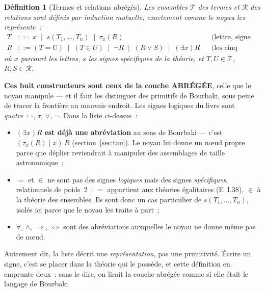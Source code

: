 \documentclass[11pt]{article}
\newtheorem{definition}{Définition}
\theoremstyle{remark}\newtheorem{example}{Exemple}
\begin{document}
\begin{definition}[Termes et relations abrégés]\label{def:langage}
Les ensembles $\mathcal{T}$ des \emph{termes} et $\mathcal{R}$ des \emph{relations}
sont définis par induction mutuelle, exactement comme le noyau les représente~:
\begin{align*}
  T &::= x \;\mid\; s(T_1,\dots,T_n) \;\mid\; \tau_x(R)
     &&\text{(lettre, signe spécifique, choix)}\\
  R &::= (T = U) \;\mid\; (T \in U) \;\mid\; \neg R \;\mid\; (R \vee S)
        \;\mid\; (\exists x)R
     &&\text{(les cinq formateurs de relation)}
\end{align*}
où $x$ parcourt les lettres, $s$ les signes spécifiques de la théorie, et
$T, U \in \mathcal{T}$, $R, S \in \mathcal{R}$.
\end{definition}

\noindent
\textbf{Ces huit constructeurs sont ceux de la couche ABRÉGÉE}, celle que le noyau
manipule --- et il faut les distinguer des primitifs de Bourbaki, sous peine de tracer
la frontière au mauvais endroit. Les signes logiques du livre sont \emph{quatre}~:
$\square$, $\tau$, $\vee$, $\neg$. Dans la liste ci-dessus~:

\begin{itemize}\itemsep1pt
\item $(\exists x)R$ \textbf{est déjà une abréviation} au sens de Bourbaki --- c'est
  $(\tau_x(R) \mid x)\,R$ (section~\ref{sec:tau}). Le noyau lui donne un n\oe{}ud propre
  parce que déplier reviendrait à manipuler des assemblages de taille astronomique~;
\item $=$ et $\in$ ne sont pas des signes \emph{logiques} mais des signes
  \emph{spécifiques}, relationnels de poids~2~: $=$ appartient aux théories égalitaires
  (E~I.38), $\in$ à la théorie des ensembles. Ils sont donc un cas particulier de
  $s(T_1,\dots,T_n)$, isolés ici parce que le noyau les traite à part~;
\item $\forall$, $\wedge$, $\Rightarrow$, $\Leftrightarrow$ sont des abréviations
  auxquelles le noyau ne donne même pas de n\oe{}ud.
\end{itemize}

\noindent
Autrement dit, la liste décrit une \emph{représentation}, pas une primitivité. Écrire un
signe, c'est se placer dans la théorie qui le possède, et cette définition en emprunte
deux~: sans le dire, on lirait la couche abrégée comme si elle était le langage de
Bourbaki.
\end{document}
